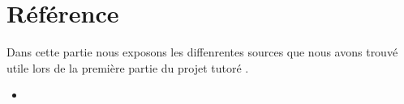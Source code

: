 \part*{Référence} %
\label{prt:référence_}
Dans cette partie nous exposons les diffenrentes sources que nous avons trouvé utile lors de la première
partie du projet tutoré .
\begin{itemize}
  	\item 
  \end{itemize}  
